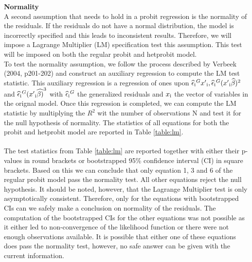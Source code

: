 \documentclass[12pt]{article}
\begin{document}
\textbf{Normality}\\
A second assumption that needs to hold in a probit regression is the normality of the residuals. If the residuals do not have a normal distribution, the model is incorrectly specified and this leads to inconsistent results. Therefore, we will impose a Lagrange Multiplier (LM) specification test this assumption. This test will be imposed on both the regular probit and hetprobit model.\\
To test the normality assumption, we follow the process described by Verbeek (2004, p201-202) and construct an auxiliary regression to compute the LM test statistic. This auxiliary regression is a regression of ones upon $\widehat{\epsilon}\textsubscript{i}^Gx^\prime\textsubscript{i},\widehat{\epsilon}\textsubscript{i}^G(x^\prime\textsubscript{i}\widehat{\beta})^2$ and $ \widehat{\epsilon}\textsubscript{i}^G(x^\prime\textsubscript{i}\widehat{\beta)}^3$ with $\widehat{\epsilon}\textsubscript{i}^G$ the generalized residuals and $x\textsubscript{i}$ the vector of variables in the orignal model. Once this regression is completed, we can compute the LM statistic by multiplying the $R^2$ wit the number of observations N and test it for the null hypothesis of normality. The statistics of all equations for both the probit and hetprobit model are reported in Table \ref{table:lm}.\\
\\
The test statistics from Table \ref{table:lm} are reported together with either their p-values in round brackets or bootstrapped 95\% confidence interval (CI) in square brackets. Based on this we can conclude that only equation 1, 3 and 6 of the regular probit model pass the normality test. All other equations reject the null hypothesis. It should be noted, however, that the Lagrange Multiplier test is only asymptotically consistent. Therefore, only for the equations with bootstrapped CIs can we safely make a conclusion on normality of the residuals. The computation of the bootstrapped CIs for the other equations was not possible as it either led to non-convergence of the likelihood function or there were not enough observations available. It is possible that either one of these equations does pass the normality test, however, no safe answer can be given with the current information.\\ 
\\
\end{document}
